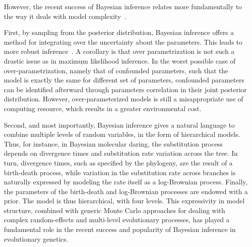However, the recent success of Bayesian inference relates more fundamentally to the way it deals with model complexity~\citep{Huelsenbeck2000a,Lartillot2020}.

First, by sampling from the posterior distribution, Bayesian inference offers a method for integrating over the uncertainty about the parameters.
This leads to more robust inference~\citep{Huelsenbeck2000a}.
A corollary is that over parametrization is not such a drastic issue as in maximum likelihood inference.
In the worst possible case of over-parametrization, namely that of confounded parameters, such that the model is exactly the same for different set of parameters, confounded parameters can be identified afterward through parameters correlation in their joint posterior distribution.
However, over-parameterized models is still a misappropriate use of computing resource, which results in a greater environmental cost.

Second, and most importantly, Bayesian inference gives a natural language to combine multiple levels of random variables, in the form of hierarchical models.
Thus, for instance, in Bayesian molecular daring, the substitution process depends on divergence times and substitution rate variation across the tree.
In turn, divergence times, such as specified by the phylogeny, are the result of a birth-death process, while variation in the substitution rate across branches is naturally expressed by modeling the rate itself as a log-Brownian process.
Finally, the parameters of the birth-death and log-Brownian processes are endowed with a prior.
The model is thus hierarchical, with four levels.
This expressivity in model structure, combined with generic Monte Carlo approaches for dealing with complex random-effects and multi-level evolutionary processes, has played a fundamental role in the recent success and popularity of Bayesian inference in evolutionary genetics.


